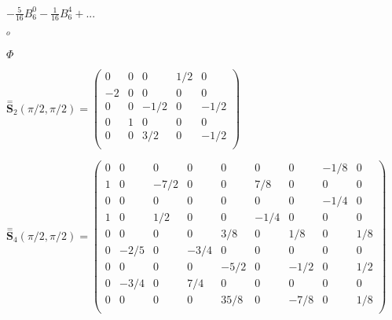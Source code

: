 \documentclass[twoside]{article}
\def\lthtmlcheckvsize{\ifdim\ht\sizebox<\vsize 
  \ifdim\wd\sizebox<\hsize\expandafter\hfill\fi \expandafter\vfill
  \else\expandafter\vss\fi}%
\begin{document}
{\newpage\clearpage
{}%
$\displaystyle -\frac{5}{16} B_6^0-\frac{1}{16} B_6^4+...$%
\lthtmlindisplaymathZ
\lthtmlcheckvsize\clearpage}

{\newpage\clearpage
{}%
$^o$%
\lthtmlindisplaymathZ
\lthtmlcheckvsize\clearpage}

{\newpage\clearpage
{}%
$\Phi$%
\lthtmlindisplaymathZ
\lthtmlcheckvsize\clearpage}

{\newpage\clearpage
{}%
$\displaystyle
 \stackrel{=}{\mathbf S}_2(\pi/2,\pi/2) = \left(
\begin{array}{ccccc}
 0 &    0 &    0 &  1/2 &    0 \\
-2 &    0 &    0 &    0 &    0 \\
 0 &    0 & -1/2 &    0 & -1/2 \\
 0 &    1 &    0 &    0 &    0 \\
 0 &    0 &  3/2 &    0 & -1/2 \\
\end{array} \right)
$%
\lthtmlindisplaymathZ
\lthtmlcheckvsize\clearpage}

{\newpage\clearpage
{}%
$\displaystyle
 \stackrel{=}{\mathbf S}_4(\pi/2,\pi/2) = \left(
\begin{array}{ccccccccc}
 0 &    0 &    0 &    0 &    0 &    0 &    0 & -1/8 &    0 \\
 1 &    0 & -7/2 &    0 &    0 &  7/8 &    0 &    0 &    0 \\
 0 &    0 &    0 &    0 &    0 &    0 &    0 & -1/4 &    0 \\
 1 &    0 &  1/2 &    0 &    0 & -1/4 &    0 &    0 &    0 \\
 0 &    0 &    0 &    0 &  3/8 &    0 &  1/8 &    0 &  1/8 \\
 0 & -2/5 &    0 & -3/4 &    0 &    0 &    0 &    0 &    0 \\
 0 &    0 &    0 &    0 & -5/2 &    0 & -1/2 &    0 &  1/2 \\
 0 & -3/4 &    0 &  7/4 &    0 &    0 &    0 &    0 &    0 \\
 0 &    0 &    0 &    0 & 35/8 &    0 & -7/8 &    0 &  1/8 \\
\end{array} \right)
$%
\lthtmlindisplaymathZ
\lthtmlcheckvsize\clearpage}
\end{document}
